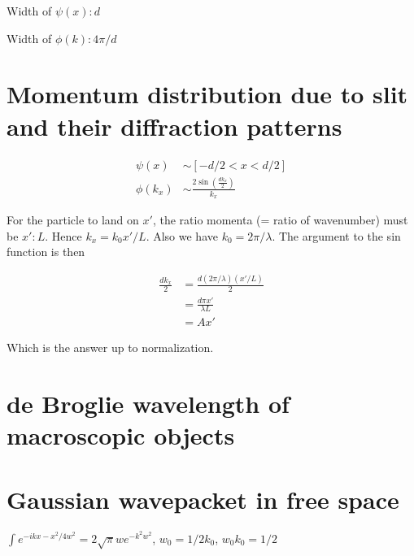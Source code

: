 \documentclass{article}
\newcommand{\<}{\langle}
\renewcommand{\>}{\rangle}
\begin{document}
Width of $\psi(x): d$

Width of $\phi(k): 4\pi/d$

\section{Momentum distribution due to slit and their diffraction patterns}

\begin{align*}
\psi(x) &\sim [-d/2 < x < d/2] \\
\phi(k_x) &\sim \frac{2\sin(\frac{dk_x}{2})}{k_x}
\end{align*}

For the particle to land on $x'$, the ratio momenta (= ratio of wavenumber) must be $x' : L$. Hence $k_x = k_0 x' / L$. Also we have $k_0 = 2\pi/\lambda$. The argument to the sin function is then

\begin{align*}
\frac{dk_x}{2} &= \frac{d (2\pi/\lambda) (x' / L)}{2} \\
&= \frac{d \pi x'}{\lambda L} \\
&= Ax'
\end{align*}

Which is the answer up to normalization.

\section{de Broglie wavelength of macroscopic objects}
\section{Gaussian wavepacket in free space}

$\int e^{-ikx - x^2 / 4w^2} = 2 \sqrt\pi w e^{-k^2 w ^2}$,
$w_0 = 1/2k_0$,
$w_0 k_0 = 1/2$
\end{document}
